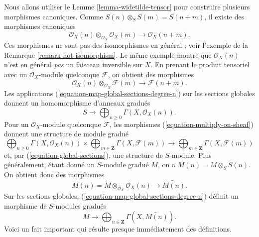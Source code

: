 \noindent
Nous allons utiliser le Lemme \ref{lemma-widetilde-tensor} pour construire
plusieurs morphismes canoniques. Comme
$S(n) \otimes_S S(m) = S(n + m)$, il existe des morphismes canoniques
\begin{equation}
\label{equation-multiply}
\mathcal{O}_X(n) \otimes_{\mathcal{O}_X} \mathcal{O}_X(m)
\longrightarrow
\mathcal{O}_X(n + m).
\end{equation}
Ces morphismes ne sont pas des isomorphismes
en général ; voir l'exemple de la
Remarque \ref{remark-not-isomorphism}. Le même exemple montre que
$\mathcal{O}_X(n)$ n'est en général {\it
pas} un faisceau inversible sur $X$.
En prenant le produit tensoriel avec un $\mathcal{O}_X$-module quelconque
$\mathcal{F}$, on obtient des morphismes
\begin{equation}
\label{equation-multiply-on-sheaf}
\mathcal{O}_X(n) \otimes_{\mathcal{O}_X} \mathcal{F}(m)
\longrightarrow
\mathcal{F}(n + m).
\end{equation}
Les applications (\ref{equation-map-global-sections-degree-n}) sur les
sections globales donnent un homomorphisme d'anneaux gradués
\begin{equation}
\label{equation-global-sections}
S \longrightarrow \bigoplus\nolimits_{n \geq 0} \Gamma(X, \mathcal{O}_X(n)).
\end{equation}
Pour un $\mathcal{O}_X$-module quelconque $\mathcal{F}$, les morphismes
(\ref{equation-multiply-on-sheaf}) donnent une structure de module gradué
\begin{equation}
\label{equation-global-sections-module}
\bigoplus\nolimits_{n \geq 0} \Gamma(X, \mathcal{O}_X(n))
\times
\bigoplus\nolimits_{m \in \mathbf{Z}} \Gamma(X, \mathcal{F}(m))
\longrightarrow
\bigoplus\nolimits_{m \in \mathbf{Z}} \Gamma(X, \mathcal{F}(m))
\end{equation}
et, par (\ref{equation-global-sections}), une structure de $S$-module.
Plus généralement, étant donné un $S$-module gradué $M$, on a
$M(n) = M \otimes_S S(n)$. On obtient donc des morphismes
\begin{equation}
\label{equation-multiply-more-generally}
\widetilde M(n)
=
\widetilde M
\otimes_{\mathcal{O}_X}
\mathcal{O}_X(n)
\longrightarrow
\widetilde{M(n)}.
\end{equation}
Sur les sections globales, (\ref{equation-map-global-sections-degree-n})
définit un morphisme de $S$-modules gradués
\begin{equation}
\label{equation-global-sections-more-generally}
M \longrightarrow
\bigoplus\nolimits_{n \in \mathbf{Z}} \Gamma(X, \widetilde{M(n)}).
\end{equation}
Voici un fait important qui résulte presque immédiatement des définitions.

